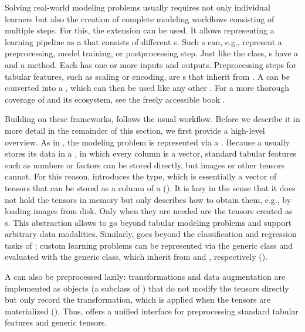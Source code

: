 \documentclass[article,shortnames]{jss}
\theoremstyle{definition}
\begin{document}
Solving real-world modeling problems usually requires not only individual learners but also the creation of complete modeling workflows consisting of multiple steps.
For this, the \mlrtpipelines{} extension can be used.
It allows representing a learning pipeline as a  that consists of different s.
Such s can, e.g., represent a preprocessing, model training, or postprocessing step.
Just like the  class, s have a  and a  method.
Each  has one or more inputs and outputs.
Preprocessing steps for tabular features, such as scaling or encoding, are s that inherit from .
A  can be converted into a , which can then be used like any other .
For a more thorough coverage of  and its ecosystem, see the freely accessible  book \citep{ref-mlr3book}.

Building on these frameworks, \mlrttorch{} follows the usual \mlrt{} workflow.
Before we describe it in more detail in the remainder of this section, we first provide a high-level overview.
As in , the modeling problem is represented via a .
Because a  usually stores its data in a , in which every column is a vector, standard tabular features such as numbers or factors can be stored directly, but images or other tensors cannot.
For this reason, \mlrttorch{} introduces the  type, which is essentially a vector of tensors that can be stored as a column of a  ().
It is lazy in the sense that it does not hold the tensors in memory but only describes how to obtain them, e.g., by loading images from disk.
Only when they are needed are the tensors created as s.
This abstraction allows \mlrttorch{} to go beyond tabular modeling problems and support arbitrary data modalities.
Similarly, \mlrttorch{} goes beyond the classification and regression tasks of \mlrt{}: custom learning problems can be represented via the generic  class and evaluated with the generic  class, which inherit from  and , respectively ().

A  can also be preprocessed lazily: transformations and data augmentation are implemented as  objects (a subclass of ) that do not modify the tensors directly but only record the transformation, which is applied when the tensors are materialized ().
Thus, \mlrttorch{} offers a unified interface for preprocessing standard tabular features and generic tensors.
\end{document}
